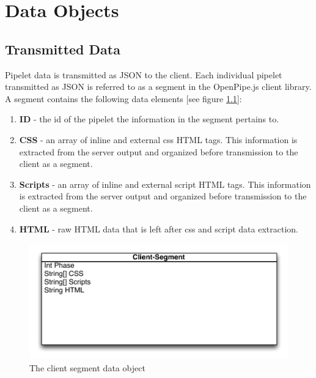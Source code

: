 \documentclass[12pt]{report}
\begin{document}
\chapter{Data Objects}

\section{Transmitted Data}

Pipelet data is transmitted as JSON to the client. Each individual pipelet transmitted as JSON is referred to as a segment in the OpenPipe.js client library. A segment contains the following data elements [see figure \ref{fig:clientSegmentDataObject}]:

\begin{enumerate}
\item \textbf{ID} - the id of the pipelet the information in the segment pertains to. 
\item \textbf{CSS} - an array of inline and external css HTML tags. This information is extracted from the server output and organized before transmission to the client as a segment.
\item \textbf{Scripts} - an array of inline and external script HTML tags. This information is extracted from the server output and organized before transmission to the client as a segment.
\item \textbf{HTML} - raw HTML data that is left after css and script data extraction.
\end{enumerate}

\begin{figure}[H]
\label{fig:clientSegmentDataObject}
\centering
\includegraphics[width=\textwidth,keepaspectratio]{figures/images/client_segment_data_object.pdf}
\caption{The client segment data object}
\end{figure}
\end{document}
